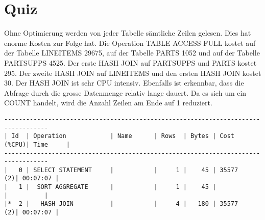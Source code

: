 \documentclass[11pt,a4paper,parskip=half]{scrartcl}
\begin{document}
\section{Quiz}
Ohne Optimierung werden von jeder Tabelle sämtliche Zeilen gelesen. Dies hat enorme Kosten zur Folge hat. Die Operation TABLE ACCESS FULL kostet auf der Tabelle LINEITEMS 29675, auf der Tabelle PARTS 1052 und auf der Tabelle PARTSUPPS 4525. Der erste HASH JOIN auf PARTSUPPS und PARTS kostet 295. Der zweite HASH JOIN auf LINEITEMS und den ersten HASH JOIN kostet 30. Der HASH JOIN ist sehr CPU intensiv. Ebenfalls ist erkennbar, dass die Abfrage durch die grosse Datenmenge relativ lange dauert. Da es sich um ein COUNT handelt, wird die Anzahl Zeilen am Ende auf 1 reduziert.
\begin{lstlisting}
----------------------------------------------------------------------------------                                                                                                                                                                                                                           
| Id  | Operation            | Name      | Rows  | Bytes | Cost (%CPU)| Time     |                                                                                                                                                                                                                           
----------------------------------------------------------------------------------                                                                                                                                                                                                                           
|   0 | SELECT STATEMENT     |           |     1 |    45 | 35577   (2)| 00:07:07 |                                                                                                                                                                                                                           
|   1 |  SORT AGGREGATE      |           |     1 |    45 |            |          |                                                                                                                                                                                                                           
|*  2 |   HASH JOIN          |           |     4 |   180 | 35577   (2)| 00:07:07 |                                                                                                                                                                                                                           

\end{lstlisting}
\end{document}

